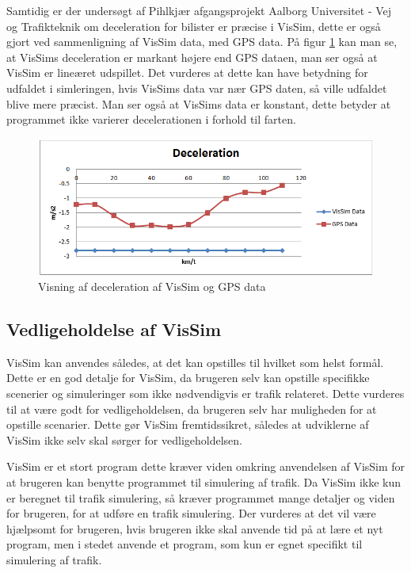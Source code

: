 Samtidig er der undersøgt af Pihlkjær afgangsprojekt Aalborg Universitet - Vej og Trafikteknik om deceleration for bilister er præcise i VisSim, dette er også gjort ved sammenligning af VisSim data, med GPS data. På figur \ref{GrafForDecelerationVisSimGPS} kan man se, at VisSims deceleration er markant højere end GPS dataen, man ser også at VisSim er lineæret udspillet. Det vurderes at dette kan have betydning for udfaldet i simleringen, hvis VisSims data var nær GPS daten, så ville udfaldet blive mere præcist. Man ser også at VisSims data er konstant, dette betyder at programmet ikke varierer decelerationen i forhold til farten. 

\begin{figure}
\begin{center}
\includegraphics[width=1.0\textwidth]{Pictures/Teknologianalyse/GrafForDecelerationVisSimGPS.png}
\end{center}
\caption{Visning af deceleration af VisSim og GPS data}
\label{GrafForDecelerationVisSimGPS}
\end{figure}

\subsection{Vedligeholdelse af VisSim}
VisSim kan anvendes således, at det kan opstilles til hvilket som helst formål. Dette er en god detalje for VisSim, da brugeren selv kan opstille specifikke scenerier og simuleringer som ikke nødvendigvis er trafik relateret. Dette vurderes til at være godt for vedligeholdelsen, da brugeren selv har muligheden for at opstille scenarier. Dette gør VisSim fremtidssikret, således at udviklerne af VisSim ikke selv skal sørger for vedligeholdelsen.

VisSim er et stort program dette kræver viden omkring anvendelsen af VisSim for at brugeren kan benytte programmet til simulering af trafik. Da VisSim ikke kun er beregnet til trafik simulering, så kræver programmet mange detaljer og viden for brugeren, for at udføre en trafik simulering. Der vurderes at det vil være hjælpsomt for brugeren, hvis brugeren ikke skal anvende tid på at lære et nyt program, men i stedet anvende et program, som kun er egnet specifikt til simulering af trafik. 



